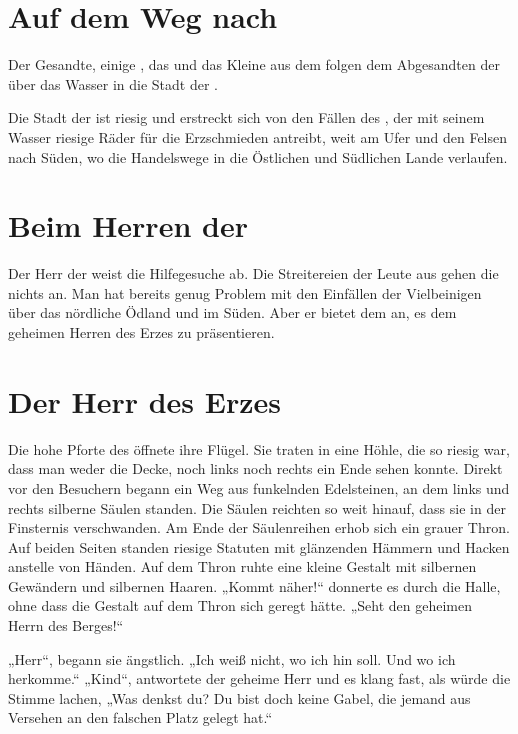 \begin{huge}
\section{Auf dem Weg nach \Dariom}
Der Gesandte, einige \Schattenjager, das \Sturmkind und das Kleine aus dem \Riesenwald folgen dem Abgesandten der \Eisenmeister über das Wasser in die Stadt der \Eisenmeister.

Die Stadt der \Eisenmeister ist riesig und erstreckt sich von den Fällen des \Dreifluss, der mit seinem Wasser riesige Räder für die Erzschmieden antreibt, weit am Ufer und den Felsen nach Süden, wo die Handelswege in die Östlichen und Südlichen Lande verlaufen.

\section{Beim Herren der \Eisenmeister}
Der Herr der \Eisenmeister weist die Hilfegesuche ab. Die Streitereien der Leute aus \Rhingell gehen die \Eisenmeister nichts an. Man hat bereits genug Problem mit den Einfällen der Vielbeinigen über das nördliche Ödland und im Süden. Aber er bietet dem \Sturmkind an, es dem geheimen Herren des Erzes zu präsentieren.

\section{Der Herr des Erzes}
Die hohe Pforte des \Abaton öffnete ihre Flügel. Sie traten in eine Höhle, die so riesig war, dass man weder die Decke, noch links noch rechts ein Ende sehen konnte. Direkt vor den Besuchern begann ein Weg aus funkelnden Edelsteinen, an dem links und rechts silberne Säulen standen. Die Säulen reichten so weit hinauf, dass sie in der Finsternis verschwanden.
Am Ende der Säulenreihen erhob sich ein grauer Thron. Auf beiden Seiten standen riesige Statuten mit glänzenden Hämmern und Hacken anstelle von Händen. Auf dem Thron ruhte eine kleine Gestalt mit silbernen Gewändern und silbernen Haaren. „Kommt näher!“ donnerte es durch die Halle, ohne dass die Gestalt auf dem Thron sich geregt hätte. „Seht den geheimen Herrn des Berges!“ 

„Herr“, begann sie ängstlich. „Ich weiß nicht, wo ich hin soll. Und wo ich herkomme.“
„Kind“, antwortete der geheime Herr und es klang fast, als würde die Stimme lachen, „Was denkst du? Du bist doch keine Gabel, die jemand aus Versehen an den falschen Platz gelegt hat.“


\end{huge}
